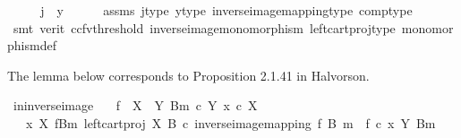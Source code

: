 \begin{isabellebody}
\ \ \isamarkupfalse%
\ \isamarkupfalse%
\ {\isachardoublequoteopen}j\ {\isacharequal}{\kern0pt}\ y{\isachardoublequoteclose}\isanewline
\ \ \ \ \isamarkupfalse%
\ assms\ j{\isacharunderscore}{\kern0pt}type\ y{\isacharunderscore}{\kern0pt}type\ inverse{\isacharunderscore}{\kern0pt}image{\isacharunderscore}{\kern0pt}mapping{\isacharunderscore}{\kern0pt}type\ comp{\isacharunderscore}{\kern0pt}type\isanewline
\ \ \ \ \isamarkupfalse%
\ {\isacharparenleft}{\kern0pt}smt\ {\isacharparenleft}{\kern0pt}verit{\isacharcomma}{\kern0pt}\ ccfv{\isacharunderscore}{\kern0pt}threshold{\isacharparenright}{\kern0pt}\ inverse{\isacharunderscore}{\kern0pt}image{\isacharunderscore}{\kern0pt}monomorphism\ left{\isacharunderscore}{\kern0pt}cart{\isacharunderscore}{\kern0pt}proj{\isacharunderscore}{\kern0pt}type\ monomorphism{\isacharunderscore}{\kern0pt}def{}{\isacharparenright}{\kern0pt}\isanewline
{}\isamarkupfalse%
%
\endisatagproof
{\isafoldproof}%
%
\isadelimproof
%
\endisadelimproof
%
\begin{isamarkuptext}%
The lemma below corresponds to Proposition 2.1.41 in Halvorson.%
\end{isamarkuptext}\isamarkuptrue%
\isamarkupfalse%
\ in{\isacharunderscore}{\kern0pt}inverse{\isacharunderscore}{\kern0pt}image{\isacharcolon}{\kern0pt}\isanewline
\ \ \ {\isachardoublequoteopen}f\ {\isacharcolon}{\kern0pt}\ X\ {\isasymrightarrow}\ Y{\isachardoublequoteclose}\ {\isachardoublequoteopen}{\isacharparenleft}{\kern0pt}B{\isacharcomma}{\kern0pt}m{\isacharparenright}{\kern0pt}\ {\isasymsubseteq}\isactrlsub c\ Y{\isachardoublequoteclose}\ {\isachardoublequoteopen}x\ {\isasymin}\isactrlsub c\ X{\isachardoublequoteclose}\isanewline
\ \ \ {\isachardoublequoteopen}{\isacharparenleft}{\kern0pt}x\ {\isasymin}\isactrlbsub X\isactrlesub \ {\isacharparenleft}{\kern0pt}f\isactrlsup {\isacharminus}{\kern0pt}B{\isasymrparr}\isactrlbsub m\isactrlesub {\isacharcomma}{\kern0pt}\ left{\isacharunderscore}{\kern0pt}cart{\isacharunderscore}{\kern0pt}proj\ X\ B\ {\isasymcirc}\isactrlsub c\ inverse{\isacharunderscore}{\kern0pt}image{\isacharunderscore}{\kern0pt}mapping\ f\ B\ m{\isacharparenright}{\kern0pt}{\isacharparenright}{\kern0pt}\ {\isacharequal}{\kern0pt}\ {\isacharparenleft}{\kern0pt}f\ {\isasymcirc}\isactrlsub c\ x\ {\isasymin}\isactrlbsub Y\isactrlesub \ {\isacharparenleft}{\kern0pt}B{\isacharcomma}{\kern0pt}m{\isacharparenright}{\kern0pt}{\isacharparenright}{\kern0pt}{\isachardoublequoteclose}\isanewline

\end{isabellebody}
